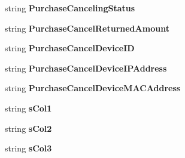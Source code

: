 \begin{DoxyCompactItemize}
\item 
string {\bfseries Purchase\+Canceling\+Status}\hypertarget{a00141_aa501de50e5332e6f5ecd53b946f60c5f}{}\label{a00141_aa501de50e5332e6f5ecd53b946f60c5f}

\item 
string {\bfseries Purchase\+Cancel\+Returned\+Amount}\hypertarget{a00141_aee603eeff521ee24f58b2628970d02f7}{}\label{a00141_aee603eeff521ee24f58b2628970d02f7}

\item 
string {\bfseries Purchase\+Cancel\+Device\+ID}\hypertarget{a00141_aaf6be8bd1aa534006382bf63ba703184}{}\label{a00141_aaf6be8bd1aa534006382bf63ba703184}

\item 
string {\bfseries Purchase\+Cancel\+Device\+I\+P\+Address}\hypertarget{a00141_a50809e82160e7d2bf21936263512cd5b}{}\label{a00141_a50809e82160e7d2bf21936263512cd5b}

\item 
string {\bfseries Purchase\+Cancel\+Device\+M\+A\+C\+Address}\hypertarget{a00141_a599962e950de59d42122577dfda58ffa}{}\label{a00141_a599962e950de59d42122577dfda58ffa}

\item 
string {\bfseries s\+Col1}\hypertarget{a00141_aeb381cbcefd731a1f843edd43a424ec0}{}\label{a00141_aeb381cbcefd731a1f843edd43a424ec0}

\item 
string {\bfseries s\+Col2}\hypertarget{a00141_ae2b8fe32396b3c6a5d9933477e6ed88b}{}\label{a00141_ae2b8fe32396b3c6a5d9933477e6ed88b}

\item 
string {\bfseries s\+Col3}\hypertarget{a00141_a841fe14a076fc7e9df12a2999ad404a7}{}\label{a00141_a841fe14a076fc7e9df12a2999ad404a7}


\end{DoxyCompactItemize}
